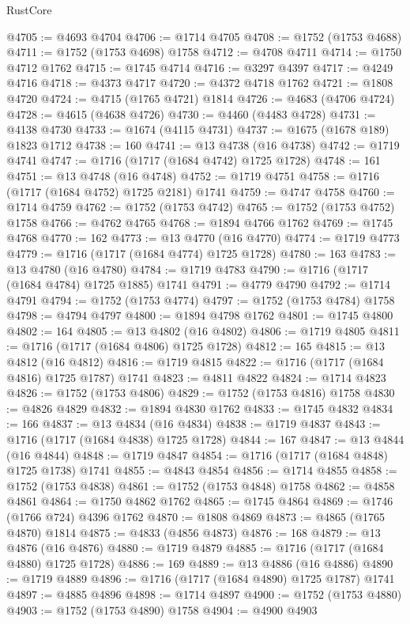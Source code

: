 \begin{lexlean}{RustCore}
\begin{coremodule}
@4705 := @4693 @4704
@4706 := @1714 @4705
@4708 := @1752 (@1753 @4688)
@4711 := @1752 (@1753 @4698) @1758
@4712 := @4708 @4711
@4714 := @1750 @4712 @1762
@4715 := @1745 @4714
@4716 := @3297 @4397
@4717 := @4249 @4716
@4718 := @4373 @4717
@4720 := @4372 @4718 @1762
@4721 := @1808 @4720
@4724 := @4715 (@1765 @4721) @1814
@4726 := @4683 (@4706 @4724)
@4728 := @4615 (@4638 @4726)
@4730 := @4460 (@4483 @4728)
@4731 := @4138 @4730
@4733 := @1674 (@4115 @4731)
@4737 := @1675 (@1678 @189) @1823 @1712
@4738 := 160
@4741 := @13 @4738 (@16 @4738)
@4742 := @1719 @4741
@4747 := @1716 (@1717 (@1684 @4742) @1725 @1728)
@4748 := 161
@4751 := @13 @4748 (@16 @4748)
@4752 := @1719 @4751
@4758 := @1716 (@1717 (@1684 @4752) @1725 @2181) @1741
@4759 := @4747 @4758
@4760 := @1714 @4759
@4762 := @1752 (@1753 @4742)
@4765 := @1752 (@1753 @4752) @1758
@4766 := @4762 @4765
@4768 := @1894 @4766 @1762
@4769 := @1745 @4768
@4770 := 162
@4773 := @13 @4770 (@16 @4770)
@4774 := @1719 @4773
@4779 := @1716 (@1717 (@1684 @4774) @1725 @1728)
@4780 := 163
@4783 := @13 @4780 (@16 @4780)
@4784 := @1719 @4783
@4790 := @1716 (@1717 (@1684 @4784) @1725 @1885) @1741
@4791 := @4779 @4790
@4792 := @1714 @4791
@4794 := @1752 (@1753 @4774)
@4797 := @1752 (@1753 @4784) @1758
@4798 := @4794 @4797
@4800 := @1894 @4798 @1762
@4801 := @1745 @4800
@4802 := 164
@4805 := @13 @4802 (@16 @4802)
@4806 := @1719 @4805
@4811 := @1716 (@1717 (@1684 @4806) @1725 @1728)
@4812 := 165
@4815 := @13 @4812 (@16 @4812)
@4816 := @1719 @4815
@4822 := @1716 (@1717 (@1684 @4816) @1725 @1787) @1741
@4823 := @4811 @4822
@4824 := @1714 @4823
@4826 := @1752 (@1753 @4806)
@4829 := @1752 (@1753 @4816) @1758
@4830 := @4826 @4829
@4832 := @1894 @4830 @1762
@4833 := @1745 @4832
@4834 := 166
@4837 := @13 @4834 (@16 @4834)
@4838 := @1719 @4837
@4843 := @1716 (@1717 (@1684 @4838) @1725 @1728)
@4844 := 167
@4847 := @13 @4844 (@16 @4844)
@4848 := @1719 @4847
@4854 := @1716 (@1717 (@1684 @4848) @1725 @1738) @1741
@4855 := @4843 @4854
@4856 := @1714 @4855
@4858 := @1752 (@1753 @4838)
@4861 := @1752 (@1753 @4848) @1758
@4862 := @4858 @4861
@4864 := @1750 @4862 @1762
@4865 := @1745 @4864
@4869 := @1746 (@1766 @724) @4396 @1762
@4870 := @1808 @4869
@4873 := @4865 (@1765 @4870) @1814
@4875 := @4833 (@4856 @4873)
@4876 := 168
@4879 := @13 @4876 (@16 @4876)
@4880 := @1719 @4879
@4885 := @1716 (@1717 (@1684 @4880) @1725 @1728)
@4886 := 169
@4889 := @13 @4886 (@16 @4886)
@4890 := @1719 @4889
@4896 := @1716 (@1717 (@1684 @4890) @1725 @1787) @1741
@4897 := @4885 @4896
@4898 := @1714 @4897
@4900 := @1752 (@1753 @4880)
@4903 := @1752 (@1753 @4890) @1758
@4904 := @4900 @4903

\end{coremodule}
\end{lexlean}
